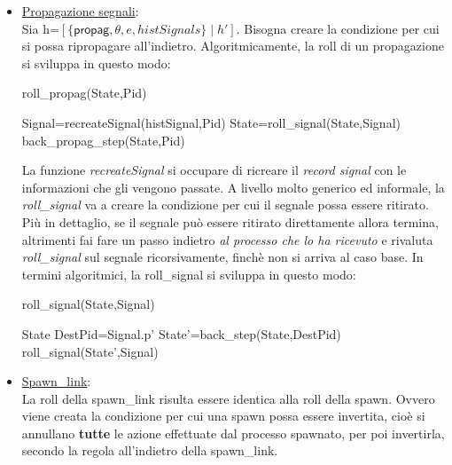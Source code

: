 \documentclass[Contributo.tex]{subfiles}
\begin{document}
	\begin{itemize}
		\item \underline{Propagazione segnali}:\\
		Sia h=$\displaystyle [\{\mathsf{propag},\theta,e,histSignals\} \mid h']$.
		Bisogna creare la condizione per cui si possa ripropagare all'indietro.
		Algoritmicamente, la roll di un propagazione si sviluppa in questo modo:\\
		\begin{algorithm}[H]
		\caption{roll\_propag(State,Pid)}
		\begin{algorithmic}
			\STATE Signal=recreateSignal(histSignal,Pid)
			\STATE State=roll\_signal(State,Signal)
		\ENDFOR
		\RETURN back\_propag\_step(State,Pid)
		\end{algorithmic}
		\end{algorithm}
		La funzione \textit{recreateSignal} si occupare di ricreare il \textit{record signal} con le informazioni che gli vengono passate. 
		A livello molto generico ed informale, la \textit{roll\_signal} va a creare la condizione per cui il segnale possa essere ritirato.
		Più in dettaglio, se il segnale può essere ritirato direttamente allora termina, altrimenti fai fare un passo indietro \textit{al processo che lo ha ricevuto} e rivaluta \textit{roll\_signal} sul segnale ricorsivamente, finchè non si arriva al caso base.
		In termini algoritmici, la roll\_signal si sviluppa in questo modo:\\
		\begin{algorithm}[H]
		\caption{roll\_signal(State,Signal)}
		\begin{algorithmic}
		\IF {Signal $\in$ $\Psi$} 
			\RETURN State
		\ELSE
			\STATE DestPid=Signal.p'
			\STATE State'=back\_step(State,DestPid)
			\RETURN roll\_signal(State',Signal)
		\ENDIF
		\end{algorithmic}
		\end{algorithm}
		\item \underline{Spawn\_link}:\\
			La roll della spawn\_link risulta essere identica alla roll della spawn.
			Ovvero viene creata la condizione per cui una spawn possa essere invertita, cioè si annullano \textbf{tutte} le azione effettuate dal processo spawnato, per poi invertirla,
			secondo la regola all'indietro della spawn\_link.
	\end{itemize}
\end{document}
